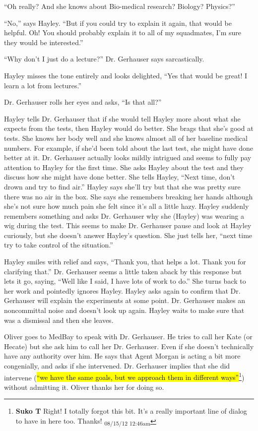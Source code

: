 ``Oh really?  And she knows about Bio-medical research?  Biology?  Physics?''

``No,'' says Hayley.  ``But if you could try to explain it again, that would be helpful.  Oh!  You should probably explain it to all of my squadmates, I'm sure they would be interested.''

``Why don't I just do a lecture?'' Dr. Gerhauser says sarcastically.

Hayley misses the tone entirely and looks delighted, ``Yes that would be great!  I learn a lot from lectures.''

Dr. Gerhauser rolls her eyes and asks, ``Is that all?''



Hayley tells Dr. Gerhauser that if she would tell Hayley more about what she expects from the tests, then Hayley would do better.  She brags that she's good at tests.  She knows her body well and she knows almost all of her baseline medical numbers.  For example, if she'd been told about the last test, she might have done better at it.  Dr. Gerhauser actually looks mildly intrigued and seems to fully pay attention to Hayley for the first time.  She asks Hayley about the test and they discuss how she might have done better.  She tells Hayley, ``Next time, don't drown and try to find air.''   Hayley says she'll try but that she was pretty sure there was no air in the box.  She says she remembers breaking her hands although she's not sure how much pain she felt since it's all a little hazy.  Hayley suddenly remembers something and asks Dr. Gerhauser why she (Hayley) was wearing a wig during the test.  This seems to make Dr. Gerhauser pause and look at Hayley curiously, but she doesn't answer Hayley's question.  She just tells her, ``next time try to take control of the situation.''



Hayley smiles with relief and says, ``Thank you, that helps a lot.  Thank you for clarifying that.''  Dr. Gerhauser seems a little taken aback by this response but lets it go, saying, ``Well like I said, I have lots of work to do.''  She turns back to her work and pointedly ignores Hayley.  Hayley asks again to confirm that Dr. Gerhauser will explain the experiments at some point.  Dr. Gerhauser makes an noncommittal noise and doesn't look up again.  Hayley waits to make sure that was a dismissal and then she leaves.



Oliver goes to MedBay to speak with Dr. Gerhauser.  He tries to call her Kate (or Hecate) but she ask him to call her Dr. Gerhauser.  Even if she doesn't technically have any authority over him.  He says that Agent Morgan is acting a bit more congenially, and asks if she intervened.  Dr. Gerhauser implies that she did intervene (\hl{``we have the same goals, but we approach them in different ways''}\footnote{\textbf{Suko T }Right!  I totally forgot this bit.  It's a really important line of dialog to have in here too.  Thanks! \textsubscript{08/15/12 12:46am}}) without admitting it.  Oliver thanks her for doing so.



